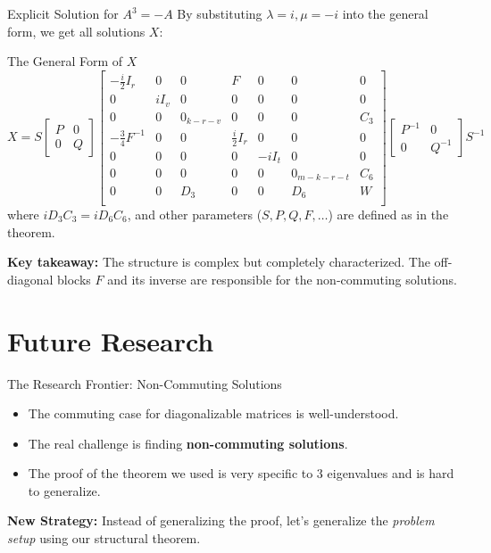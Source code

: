 \documentclass{beamer}
\begin{document}
\begin{frame}{Explicit Solution for $A^3 = -A$}
  By substituting $\lambda=i, \mu=-i$ into the general form, we get all solutions $X$:
  \begin{block}{The General Form of $X$}
  \footnotesize
  \[X = S \begin{bmatrix} P & 0 \\ 0 & Q \end{bmatrix} \left[ \begin{array}{ccc|ccc|c} - \frac{i}{2} I_r & 0 & 0 & F & 0 & 0 & 0 \\ 0 & i I_v & 0 & 0 & 0 & 0 & 0 \\ 0 & 0 & 0_{k-r-v} & 0 & 0 & 0 & C_3 \\ \hline - \frac{3}{4} F^{-1} & 0 & 0 & \frac{i}{2} I_r & 0 & 0 & 0 \\ 0 & 0 & 0 & 0 & -i I_t & 0 & 0 \\ 0 & 0 & 0 & 0 & 0 & 0_{m-k-r-t} & C_6 \\ \hline 0 & 0 & D_3 & 0 & 0 & D_6 & W \\ \end{array} \right] \begin{bmatrix} P^{-1} & 0 \\ 0 & Q^{-1} \end{bmatrix} S^{-1}\]
  where $i D_3 C_3 = i D_6 C_6$, and other parameters ($S, P, Q, F, \dots$) are defined as in the theorem.
  \end{block}
  \normalsize %
  \vfill
  \textbf{Key takeaway:} The structure is complex but completely characterized. The off-diagonal blocks $F$ and its inverse are responsible for the non-commuting solutions.
\end{frame}

\section{Future Research}

\begin{frame}{The Research Frontier: Non-Commuting Solutions}
  \begin{itemize}
    \item The commuting case for diagonalizable matrices is well-understood. \cite{diagonalizable}
    \item The real challenge is finding \textbf{non-commuting solutions}.
    \item The proof of the theorem we used is very specific to 3 eigenvalues and is hard to generalize.
  \end{itemize}
  \vfill
  \textbf{New Strategy:} Instead of generalizing the proof, let's generalize the \textit{problem setup} using our structural theorem.
\end{frame}
\end{document}
